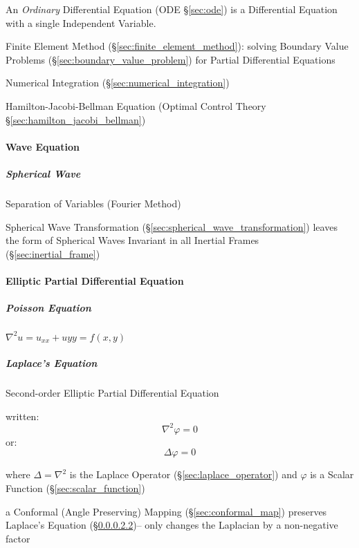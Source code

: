 \fist An \emph{Ordinary} Differential Equation (ODE \S\ref{sec:ode}) is a
Differential Equation with a single Independent Variable.

Finite Element Method (\S\ref{sec:finite_element_method}): solving
Boundary Value Problems (\S\ref{sec:boundary_value_problem}) for
Partial Differential Equations

\fist Numerical Integration (\S\ref{sec:numerical_integration})

\fist Hamilton-Jacobi-Bellman Equation (Optimal Control Theory
\S\ref{sec:hamilton_jacobi_bellman})



\paragraph{Wave Equation}\label{sec:dirichlet_problem}\hfill

\subparagraph{Spherical Wave}\label{sec:spherical_wave}\hfill

Separation of Variables (Fourier Method)

Spherical Wave Transformation (\S\ref{sec:spherical_wave_transformation})
leaves the form of Spherical Waves Invariant in all Inertial Frames
(\S\ref{sec:inertial_frame})



\paragraph{Elliptic Partial Differential Equation}
\label{sec:elliptic_partial_differential}\hfill

\subparagraph{Poisson Equation}\label{sec:poisson_equation}\hfill

$\nabla^2 u = u_{xx} + u{yy} = f(x,y)$



\subparagraph{Laplace's Equation}\label{sec:laplaces_equation}\hfill

Second-order Elliptic Partial Differential Equation

written:
\[ \nabla^2 \varphi = 0 \]
or:
\[ \Delta \varphi = 0 \]

where $\Delta = \nabla^2$ is the Laplace Operator
(\S\ref{sec:laplace_operator}) and $\varphi$ is a Scalar Function
(\S\ref{sec:scalar_function})

a Conformal (Angle Preserving) Mapping (\S\ref{sec:conformal_map}) preserves
Laplace's Equation (\S\ref{sec:laplaces_equation})-- only changes the Laplacian
by a non-negative factor

